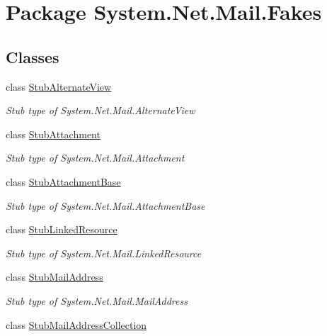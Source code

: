 \hypertarget{namespace_system_1_1_net_1_1_mail_1_1_fakes}{\section{Package System.\-Net.\-Mail.\-Fakes}
\label{namespace_system_1_1_net_1_1_mail_1_1_fakes}
}
\subsection*{Classes}
\begin{DoxyCompactItemize}
\item 
class \hyperlink{class_system_1_1_net_1_1_mail_1_1_fakes_1_1_stub_alternate_view}{Stub\-Alternate\-View}
\begin{DoxyCompactList}\small\item\em Stub type of System.\-Net.\-Mail.\-Alternate\-View\end{DoxyCompactList}\item 
class \hyperlink{class_system_1_1_net_1_1_mail_1_1_fakes_1_1_stub_attachment}{Stub\-Attachment}
\begin{DoxyCompactList}\small\item\em Stub type of System.\-Net.\-Mail.\-Attachment\end{DoxyCompactList}\item 
class \hyperlink{class_system_1_1_net_1_1_mail_1_1_fakes_1_1_stub_attachment_base}{Stub\-Attachment\-Base}
\begin{DoxyCompactList}\small\item\em Stub type of System.\-Net.\-Mail.\-Attachment\-Base\end{DoxyCompactList}\item 
class \hyperlink{class_system_1_1_net_1_1_mail_1_1_fakes_1_1_stub_linked_resource}{Stub\-Linked\-Resource}
\begin{DoxyCompactList}\small\item\em Stub type of System.\-Net.\-Mail.\-Linked\-Resource\end{DoxyCompactList}\item 
class \hyperlink{class_system_1_1_net_1_1_mail_1_1_fakes_1_1_stub_mail_address}{Stub\-Mail\-Address}
\begin{DoxyCompactList}\small\item\em Stub type of System.\-Net.\-Mail.\-Mail\-Address\end{DoxyCompactList}\item 
class \hyperlink{class_system_1_1_net_1_1_mail_1_1_fakes_1_1_stub_mail_address_collection}{Stub\-Mail\-Address\-Collection}

\end{DoxyCompactItemize}
